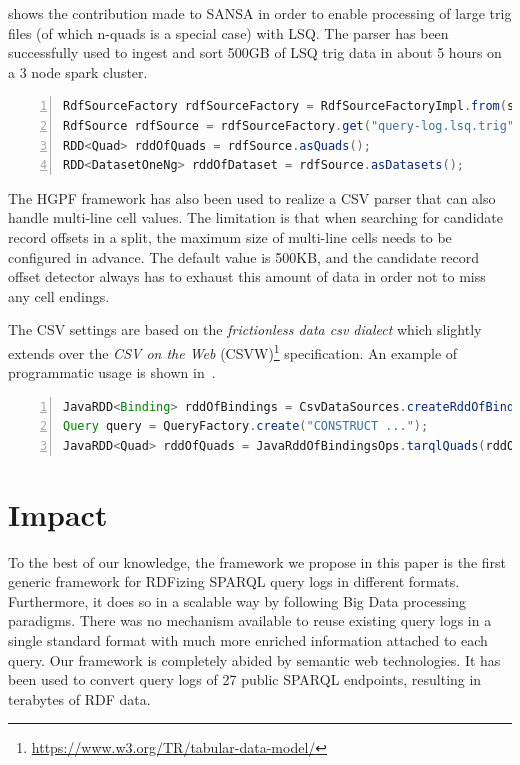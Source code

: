  shows the contribution made to SANSA in order to enable processing of large trig files (of which n-quads is a special case) with LSQ. The parser has been successfully used to ingest and sort 500GB of LSQ trig data in about 5 hours on a 3 node spark cluster.

\begin{lstlisting}[label=lst:sansa-rdf,language=java, caption=Parsing named graph streams, style=lst, language=java, numbers=left]
RdfSourceFactory rdfSourceFactory = RdfSourceFactoryImpl.from(sparkSession);
RdfSource rdfSource = rdfSourceFactory.get("query-log.lsq.trig");
RDD<Quad> rddOfQuads = rdfSource.asQuads();
RDD<DatasetOneNg> rddOfDataset = rdfSource.asDatasets();
\end{lstlisting}

The HGPF framework has also been used to realize a CSV parser that can also handle multi-line cell values. The limitation is that when searching for candidate record offsets in a split, the maximum size of multi-line cells needs to be configured in advance.
The default value is 500KB, and the candidate record offset detector always has to exhaust this amount of data in order not to miss any cell endings.

The CSV settings are based on the \emph{frictionless data csv dialect} which slightly extends
over the \emph{CSV on the Web} (CSVW)\footnote{\url{https://www.w3.org/TR/tabular-data-model/}} specification.
An example of programmatic usage is shown in~.
\begin{lstlisting}[label=lst:sansa-csv,language=java, caption=Example for setting up and skolemizing a basic LSQ RDF model, style=lst, language=java, numbers=left]
JavaRDD<Binding> rddOfBindings = CsvDataSources.createRddOfBindings(sparkContext, "data.csv", csvDialect);
Query query = QueryFactory.create("CONSTRUCT ...");
JavaRDD<Quad> rddOfQuads = JavaRddOfBindingsOps.tarqlQuads(rddOfBindings, query);
\end{lstlisting}





\section{Impact}
To the best of our knowledge, the framework we propose in this paper is the first generic framework for RDFizing SPARQL query logs in different formats.
Furthermore, it does so in a scalable way by following Big Data processing paradigms.
There was no mechanism available to reuse existing query logs in a single standard format with much more enriched information attached to each query.
Our framework is completely abided by semantic web technologies.
It has been used to convert query logs of 27 public SPARQL endpoints, resulting in terabytes of RDF data.

